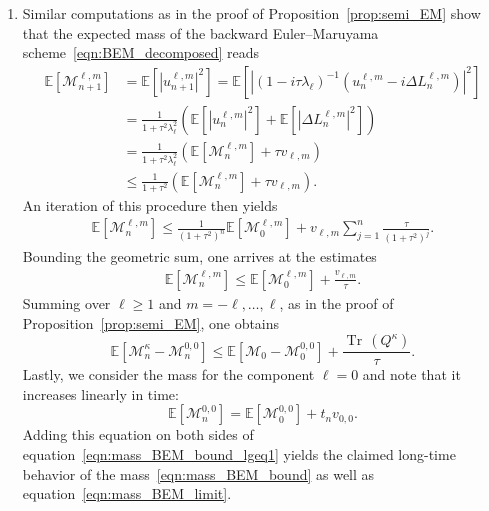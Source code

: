 \documentclass[11pt]{amsart}
\newcommand{\E}{{\mathbb E}}
\newcommand{\tr}{{\operatorname{Tr}\, }}
\newcommand{\cM}{\mathcal M}
\begin{document}
\begin{appendixproof}
\begin{enumerate}[label=\roman*)]
    \item \label{pf-bem-mass} Similar computations as in the proof of Proposition~\ref{prop:semi_EM} show that the expected mass of the backward Euler--Maruyama scheme~\eqref{eqn:BEM_decomposed} reads
\begin{align*}
     \E\left[\cM_{n+1}^{\ell,m}\right]&=\E\left[\left\lvert u_{n+1}^{\ell,m} \right\rvert^2\right] = \E\left[\left\lvert \left(1 - i\tau \lambda_\ell\right)^{-1}\left(u_n^{\ell,m} - i\Delta L^{\ell, m}_n\right)\right\rvert^2\right] \\
    & = \frac{1}{1 + \tau^2 \lambda_\ell^2}\left(\E\left[\left\lvert u_n^{\ell,m}\right\rvert^2 \right] + \E\left[\left\lvert \Delta L^{\ell, m}_n\right\rvert^2\right]\right)\\
    & = \frac{1}{1 + \tau^2 \lambda_\ell^2}\left(\E\left[\cM_n^{\ell,m} \right] + \tau v_{\ell, m}\right)\\
    & \leq \frac{1}{1 + \tau^2}\left(\E\left[\cM_n^{\ell,m} \right] + \tau v_{\ell, m}\right).
\end{align*}
An iteration of this procedure then yields
\begin{align*}
    \E\left[\cM_n^{\ell,m}\right] \leq \frac{1}{\left(1+\tau^2\right)^n}\E\left[\cM_0^{\ell,m}\right] + v_{\ell,m}\sum_{j=1}^{n}\frac{\tau }{\left(1+\tau^2\right)^j}.
\end{align*}
Bounding the geometric sum, one arrives at the estimates
\begin{align*}
    \E\left[\cM_n^{\ell,m}\right] \leq \E\left[\cM_0^{\ell,m}\right] + \frac{v_{\ell, m}}{\tau}.
\end{align*}
Summing over $\ell \geq 1$ and $m = -\ell, \dots, \ell$, as in the proof of Proposition~\ref{prop:semi_EM}, one obtains
\begin{equation}\label{eqn:mass_BEM_bound_lgeq1}
            \E\left[\cM^\kappa_n - \cM_n^{0,0}\right] \leq \E\left[\cM_0 - \cM_0^{0,0}\right] + \frac{\tr(Q^\kappa)}{\tau}.
\end{equation}
Lastly, we consider the mass for the component $\ell=0$ and note that it increases linearly in time:
\begin{equation*}
    \E\left[\cM_n^{0,0}\right] = \E\left[\cM_0^{0,0}\right] + t_n v_{0,0}.
\end{equation*}
Adding this equation on both sides of equation~\eqref{eqn:mass_BEM_bound_lgeq1} yields the claimed long-time behavior of the mass~\eqref{eqn:mass_BEM_bound} as well as equation~\eqref{eqn:mass_BEM_limit}.


\end{enumerate}
\end{appendixproof}
\end{document}
